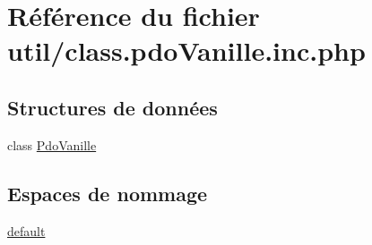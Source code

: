 \hypertarget{class_8pdo_vanille_8inc_8php}{}\section{Référence du fichier util/class.pdo\+Vanille.\+inc.\+php}
\label{class_8pdo_vanille_8inc_8php}
\subsection*{Structures de données}
\begin{DoxyCompactItemize}
\item 
class \hyperlink{class_pdo_vanille}{Pdo\+Vanille}
\end{DoxyCompactItemize}
\subsection*{Espaces de nommage}
\begin{DoxyCompactItemize}
\item 
 \hyperlink{namespacedefault}{default}
\end{DoxyCompactItemize}
